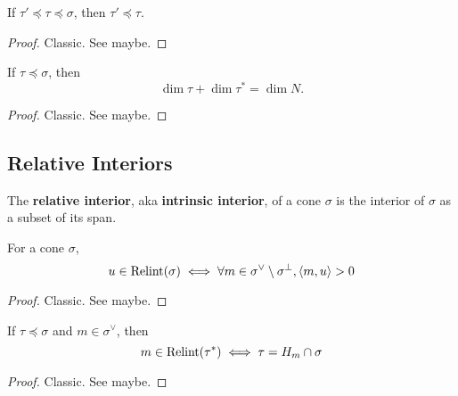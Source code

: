 \begin{proposition}
  \label{1-2-10-dual-face-antitone}

  If $\tau' \preceq \tau \preceq \sigma$, then $\tau' \preceq \tau$.
\end{proposition}
\begin{proof}
  \uses{}

  Classic. See \cite{Oda_1988} maybe.
\end{proof}


\begin{proposition}
  \label{1-2-10-double-dual-face-dual-face}

  If $\tau \preceq \sigma$, then
  $$\dim \tau + \dim \tau^* = \dim N.$$
\end{proposition}
\begin{proof}
  \uses{}

  Classic. See \cite{Oda_1988} maybe.
\end{proof}


\subsection{Relative Interiors}


\begin{definition}
  \label{1-2-rel-interior}
  \uses{}
  \leanok

  The {\bf relative interior}, aka {\bf intrinsic interior}, of a cone $\sigma$ is the interior of $\sigma$ as a subset of its span.
\end{definition}


\begin{lemma}
  \label{1-2-rel-interior-inner}

  For a cone $\sigma$,
  $$u \in \operatorname{Relint}(\sigma) \iff \forall m \in \sigma^\vee \setminus \sigma^\perp, \langle m, u\rangle > 0$$
\end{lemma}
\begin{proof}
  \uses{}

  Classic. See \cite{Oda_1988} maybe.
\end{proof}


\begin{lemma}
  \label{1-2-rel-interior-dual-face}

  If $\tau \preceq \sigma$ and $m \in \sigma^\vee$, then
  $$m \in \operatorname{Relint}(\tau^*) \iff \tau = H_m \cap \sigma$$
\end{lemma}
\begin{proof}
  \uses{}

  Classic. See \cite{Oda_1988} maybe.
\end{proof}


